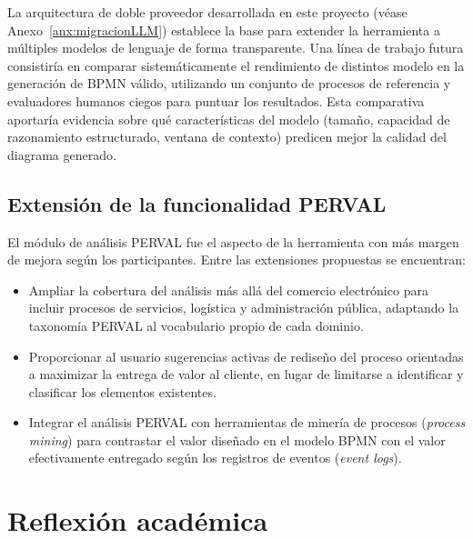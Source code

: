 La arquitectura de doble proveedor desarrollada en este proyecto (véase Anexo~\ref{anx:migracionLLM}) establece la base para extender la herramienta a múltiples modelos de lenguaje de forma transparente. Una línea de trabajo futura consistiría en comparar sistemáticamente el rendimiento de distintos modelo en la generación de BPMN válido, utilizando un conjunto de procesos de referencia y evaluadores humanos ciegos para puntuar los resultados. Esta comparativa aportaría evidencia sobre qué características del modelo (tamaño, capacidad de razonamiento estructurado, ventana de contexto) predicen mejor la calidad del diagrama generado.

\subsection{Extensión de la funcionalidad PERVAL}

El módulo de análisis PERVAL fue el aspecto de la herramienta con más margen de mejora según los participantes. Entre las extensiones propuestas se encuentran:

\begin{itemize}
  \item Ampliar la cobertura del análisis más allá del comercio electrónico para incluir procesos de servicios, logística y administración pública, adaptando la taxonomía PERVAL al vocabulario propio de cada dominio.
  \item Proporcionar al usuario sugerencias activas de rediseño del proceso orientadas a maximizar la entrega de valor al cliente, en lugar de limitarse a identificar y clasificar los elementos existentes.
  \item Integrar el análisis PERVAL con herramientas de minería de procesos (\textit{process mining}) para contrastar el valor diseñado en el modelo BPMN con el valor efectivamente entregado según los registros de eventos (\textit{event logs}).
\end{itemize}



\section{Reflexión académica}\label{sec:reflexion}

